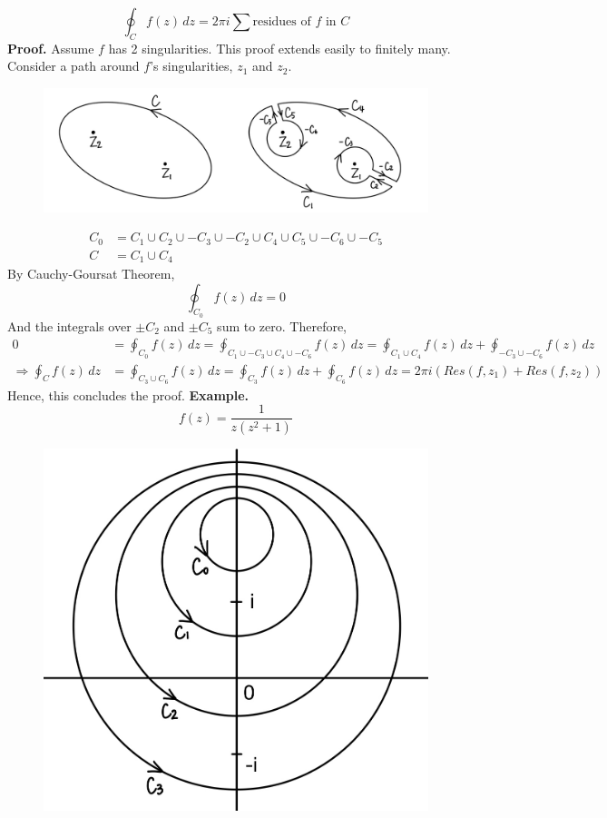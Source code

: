 \documentclass[11pt]{article}
\begin{document}
$$ \oint_C f(z) \, dz = 2\pi i \sum \mbox{residues of } f \mbox{ in } C$$
\textbf{Proof.} Assume $f$ has 2 singularities. This proof extends easily to finitely many. Consider a path around $f$'s singularities, $z_1$ and $z_2$.
\begin{figure}[h]
\includegraphics[scale=0.2]{20_2} 
\centering
\end{figure}
\begin{align*}
C_0 &= C_1 \cup C_2 \cup -C_3 \cup -C_2 \cup C_4 \cup C_5 \cup -C_6 \cup -C_5 \\
C &= C_1 \cup C_4
\end{align*}
By Cauchy-Goursat Theorem, 
$$ \oint_{C_0}f(z) \, dz = 0$$
And the integrals over $\pm C_2$ and $\pm C_5$ sum to zero. Therefore, 
\begin{align*}
0 &= \oint_{C_0}f(z) \, dz = \oint_{C_1 \cup -C_3 \cup C_4 \cup -C_6} f(z) \, dz = \oint_{C_1 \cup C_4}f(z) \,dz + \oint_{-C_3 \cup -C_6} f(z) \,dz\\
\Rightarrow \oint_Cf(z) \, dz &= \oint_{C_3 \cup C_6} f(z) \, dz = \oint_{C_3}f(z) \,dz + \oint_{C_6}f(z)\,dz = 2\pi i(Res(f, z_1) + Res(f, z_2)) 
\end{align*}
Hence, this concludes the proof. 
\newpage
\textbf{Example.} 
$$f(z) = \frac{1}{z(z^2 + 1)} $$
\begin{figure}[h]
\includegraphics[scale=0.3]{20_3} 
\centering
\end{figure}
\end{document}
